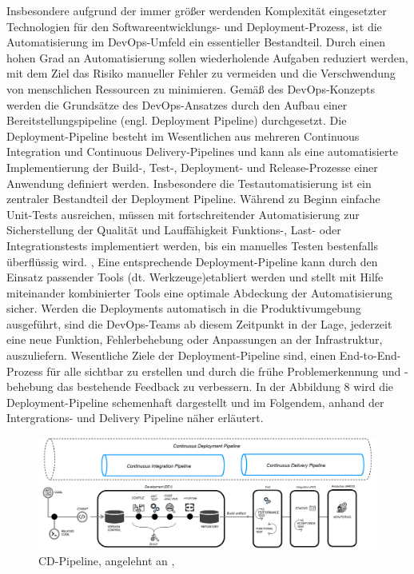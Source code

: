 Insbesondere aufgrund der immer größer werdenden Komplexität eingesetzter Technologien für den Softwareentwicklungs- und Deployment-Prozess, ist die Automatisierung im DevOps-Umfeld ein essentieller Bestandteil. Durch einen hohen Grad an Automatisierung sollen wiederholende Aufgaben reduziert werden, mit dem Ziel das Risiko manueller Fehler zu vermeiden und die Verschwendung von menschlichen Ressourcen zu minimieren. Gemäß des DevOps-Konzepts werden die Grundsätze des DevOps-Ansatzes durch den Aufbau einer Bereitstellungspipeline (engl. Deployment Pipeline) durchgesetzt. Die Deployment-Pipeline besteht im Wesentlichen aus mehreren Continuous Integration und Continuous Delivery-Pipelines und kann als eine automatisierte Implementierung der Build-, Test-, Deployment- und Release-Prozesse einer Anwendung definiert werden. \cite{humble_why_2011} Insbesondere die Testautomatisierung ist ein zentraler Bestandteil der Deployment Pipeline. Während zu Beginn einfache Unit-Tests ausreichen, müssen mit fortschreitender Automatisierung zur Sicherstellung der Qualität und Lauffähigkeit Funktions-, Last- oder Integrationstests implementiert werden, bis ein manuelles Testen bestenfalls überflüssig wird. \cite[S. 27]{alt_innovationsorientiertes_2017}, \cite[S. 110 - 111]{wolff_continuous_2016} Eine entsprechende Deployment-Pipeline kann durch den Einsatz passender Tools (dt. Werkzeuge)etabliert werden und stellt mit Hilfe miteinander kombinierter Tools eine optimale Abdeckung der Automatisierung sicher. \cite[S. 268]{tokarski_strategische_2018} Werden die Deployments automatisch in die Produktivumgebung ausgeführt, sind die DevOps-Teams ab diesem Zeitpunkt in der Lage, jederzeit eine neue Funktion, Fehlerbehebung oder Anpassungen an der Infrastruktur, auszuliefern. \cite{juner_praxisbasierte_2017} Wesentliche Ziele der Deployment-Pipeline sind, einen End-to-End-Prozess für alle sichtbar zu erstellen und durch die frühe Problemerkennung und -behebung das bestehende Feedback zu verbessern. \cite[S. 3 - 4]{humble_continuous_2011} In der Abbildung 8 wird die Deployment-Pipeline schemenhaft dargestellt und im Folgendem, anhand der Intergrations- und Delivery Pipeline näher erläutert.  

\begin{figure}[h]
    \centering
    \includegraphics[scale=0.4]{Bilder/Continuous Deployment Pipeline.png}
    \caption{CD-Pipeline, angelehnt an \cite{balajee_what_2020}, \cite[S. 17]{sharma_devops_2017}}
\end{figure}

